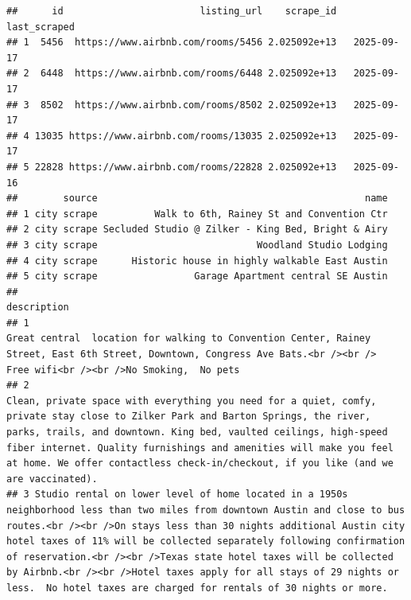 \documentclass[
]{article}
\begin{document}
\begin{verbatim}
##      id                        listing_url    scrape_id last_scraped
## 1  5456  https://www.airbnb.com/rooms/5456 2.025092e+13   2025-09-17
## 2  6448  https://www.airbnb.com/rooms/6448 2.025092e+13   2025-09-17
## 3  8502  https://www.airbnb.com/rooms/8502 2.025092e+13   2025-09-17
## 4 13035 https://www.airbnb.com/rooms/13035 2.025092e+13   2025-09-17
## 5 22828 https://www.airbnb.com/rooms/22828 2.025092e+13   2025-09-16
##        source                                               name
## 1 city scrape          Walk to 6th, Rainey St and Convention Ctr
## 2 city scrape Secluded Studio @ Zilker - King Bed, Bright & Airy
## 3 city scrape                            Woodland Studio Lodging
## 4 city scrape      Historic house in highly walkable East Austin
## 5 city scrape                 Garage Apartment central SE Austin
##                                                                                                                                                                                                                                                                                                                                                                                                                                                                                   description
## 1                                                                                                                                                                                                                                                                                                               Great central  location for walking to Convention Center, Rainey Street, East 6th Street, Downtown, Congress Ave Bats.<br /><br />  Free wifi<br /><br />No Smoking,  No pets
## 2                                                                                                                           Clean, private space with everything you need for a quiet, comfy, private stay close to Zilker Park and Barton Springs, the river, parks, trails, and downtown. King bed, vaulted ceilings, high-speed fiber internet. Quality furnishings and amenities will make you feel at home. We offer contactless check-in/checkout, if you like (and we are vaccinated).
## 3 Studio rental on lower level of home located in a 1950s neighborhood less than two miles from downtown Austin and close to bus routes.<br /><br />On stays less than 30 nights additional Austin city hotel taxes of 11% will be collected separately following confirmation of reservation.<br /><br />Texas state hotel taxes will be collected by Airbnb.<br /><br />Hotel taxes apply for all stays of 29 nights or less.  No hotel taxes are charged for rentals of 30 nights or more.

\end{verbatim}
\end{document}
